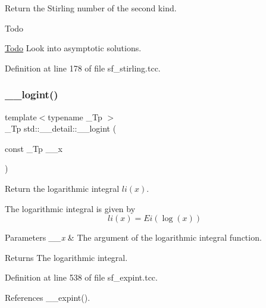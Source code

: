 Return the Stirling number of the second kind.

\begin{DoxyRefDesc}{Todo}
\item[\hyperlink{todo__todo000016}{Todo}]Look into asymptotic solutions. \end{DoxyRefDesc}


Definition at line 178 of file sf\+\_\+stirling.\+tcc.

\mbox{\label{namespacestd_1_1____detail_a4d5f8cb2b4e6e192faba9418ec14149f}} 
\subsubsection{\texorpdfstring{\+\_\+\+\_\+logint()}{\_\_logint()}}
{\footnotesize\ttfamily template$<$typename \+\_\+\+Tp $>$ \\
\+\_\+\+Tp std\+::\+\_\+\+\_\+detail\+::\+\_\+\+\_\+logint (\begin{DoxyParamCaption}\item[{const \+\_\+\+Tp}]{\+\_\+\+\_\+x }\end{DoxyParamCaption})}



Return the logarithmic integral $ li(x) $. 

The logarithmic integral is given by \[ li(x) = Ei(\log(x)) \]


\begin{DoxyParams}{Parameters}
{\em \+\_\+\+\_\+x} & The argument of the logarithmic integral function. \\
\hline
\end{DoxyParams}
\begin{DoxyReturn}{Returns}
The logarithmic integral. 
\end{DoxyReturn}


Definition at line 538 of file sf\+\_\+expint.\+tcc.



References \+\_\+\+\_\+expint().

\mbox{\label{namespacestd_1_1____detail_abe893340d3de850ff3c9701deb914f96}} 
